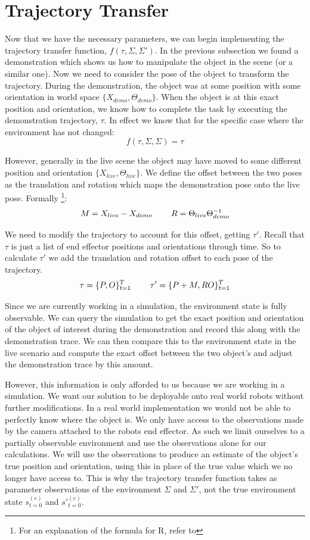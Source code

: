 \section{Trajectory Transfer}
\label{sec:alignment}
Now that we have the necessary parameters, we can begin implementing the trajectory transfer function, $f(\tau, \Sigma, \Sigma')$. In the previous subsection we found a demonstration which shows us how to manipulate the object in the scene (or a similar one). Now we need to consider the pose of the object to transform the trajectory. During the demonstration, the object was at some position with some orientation in world space $\{X_{demo}, \Theta_{demo}\}$. When the object is at this exact position and orientation, we know how to complete the task by executing the demonstration trajectory, $\tau$. In effect we know that for the specific case where the environment has not changed:
$$f(\tau, \Sigma, \Sigma) = \tau$$

However, generally in the live scene the object may have moved to some different position and orientation $\{X_{live}, \Theta_{live}\}$. We define the offset between the two poses as the translation and rotation which maps the demonstration pose onto the live pose. Formally \footnote{For an explanation of the formula for R, refer to }:
$$M = X_{live} - X_{demo} \operatorname{\operatorname{\: \: \: \:} \operatorname{\: \: \: \:}} R = \Theta_{live} \Theta_{demo}^{-1}$$ 

We need to modify the trajectory to account for this offset, getting $\tau'$. Recall that $\tau$ is just a list of end effector positions and orientations through time. So to calculate $\tau'$ we add the translation and rotation offset to each pose of the trajectory.
$$\tau = \{P, O\}_{t=1}^T \operatorname{\operatorname{\: \: \: \:} \operatorname{\: \: \: \:}} \tau' = \{P + M, RO\}_{t=1}^T$$

Since we are currently working in a simulation, the environment state is fully observable. We can query the simulation to get the exact position and orientation of the object of interest during the demonstration and record this along with the demonstration trace. We can then compare this to the environment state in the live scenario and compute the exact offset between the two object's and adjust the demonstration trace by this amount.

However, this information is only afforded to us because we are working in a simulation. We want our solution to be deployable onto real world robots without further modifications. In a real world implementation we would not be able to perfectly know where the object is. We only have access to the observations made by the camera attached to the robots end effector. As such we limit ourselves to a partially observable environment and use the observations alone for our calculations. We will use the observations to produce an estimate of the object's true position and orientation, using this in place of the true value which we no longer have access to. This is why the trajectory transfer function takes as parameter observations of the environment $\Sigma$ and $\Sigma'$, not the true environment state $s^{(e)}_{t=0}$ and $s'^{(e)}_{t=0}$.\\

